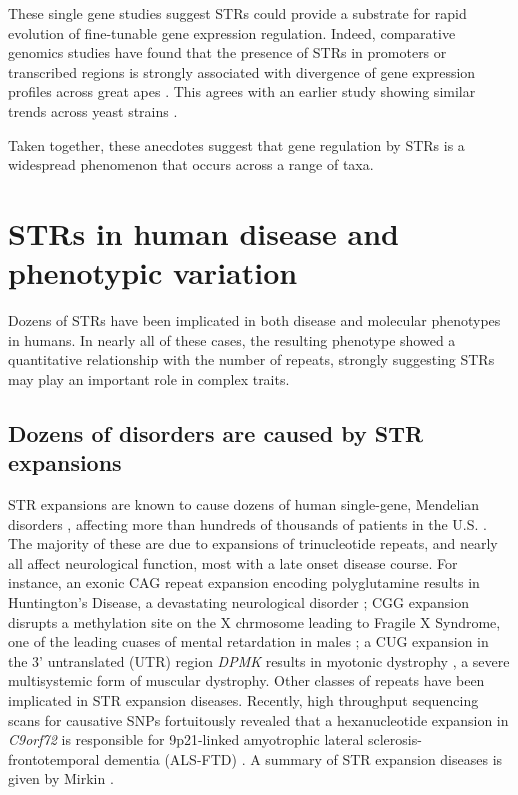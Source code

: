 These single gene studies suggest STRs could provide a substrate for rapid evolution of fine-tunable gene expression regulation. Indeed, comparative genomics studies have found that the presence of STRs in promoters or transcribed regions is strongly associated with divergence of gene expression profiles across great apes \cite{SonayCarvalhoRobinsonEtAl2015}. This agrees with an earlier study showing similar trends across yeast strains \cite{VincesLegendreCaldaraEtAl2009}. 

Taken together, these anecdotes suggest that gene regulation by STRs is a widespread phenomenon that occurs across a range of taxa.

\section{STRs in human disease and phenotypic variation}
Dozens of STRs have been implicated in both disease and molecular phenotypes in humans. In nearly all of these cases, the resulting phenotype showed a quantitative relationship with the number of repeats, strongly suggesting STRs may play an important role in complex traits.

\subsection{Dozens of disorders are caused by STR expansions}
STR expansions are known to cause dozens of human single-gene, Mendelian disorders \cite{Mirkin2007}, affecting more than hundreds of thousands of patients in the U.S. \cite{CoffeeKeithAlbizuaEtAl2009}. The majority of these are due to expansions of trinucleotide repeats, and nearly all affect neurological function, most with a late onset disease course. For instance, an exonic CAG repeat expansion encoding polyglutamine results in Huntington's Disease, a devastating neurological disorder \cite{Mirkin2007}; CGG expansion disrupts a methylation site on the X chrmosome leading to Fragile X Syndrome, one of the leading cuases of mental retardation in males \cite{LyonLaverYuEtAl2010}; a CUG expansion in the 3' untranslated (UTR) region \emph{DPMK} results in myotonic dystrophy \cite{BrookMcCurrachHarleyEtAl1992}, a severe multisystemic form of muscular dystrophy. 
Other classes of repeats have been implicated in STR expansion diseases. Recently, high throughput sequencing scans for causative SNPs fortuitously revealed that a hexanucleotide expansion in \emph{C9orf72} is responsible for 9p21-linked amyotrophic lateral sclerosis-frontotemporal dementia (ALS-FTD) \cite{RentonMajounieWaiteEtAl}. A summary of STR expansion diseases is given by Mirkin \cite{Mirkin2007}. %

